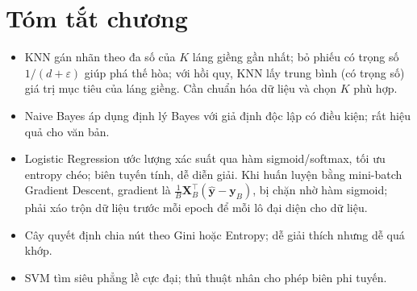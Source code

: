 \section{Tóm tắt chương}
\begin{itemize}
    \item KNN gán nhãn theo đa số của $K$ láng giềng gần nhất; bỏ phiếu có trọng số $1/(d + \varepsilon)$ giúp phá thế hòa; với hồi quy, KNN lấy trung bình (có trọng số) giá trị mục tiêu của láng giềng. Cần chuẩn hóa dữ liệu và chọn $K$ phù hợp.
    \item Naive Bayes áp dụng định lý Bayes với giả định độc lập có điều kiện; rất hiệu quả cho văn bản.
    \item Logistic Regression ước lượng xác suất qua hàm sigmoid/softmax, tối ưu entropy chéo; biên tuyến tính, dễ diễn giải. Khi huấn luyện bằng mini-batch Gradient Descent, gradient là $\frac{1}{B}\mathbf{X}_B^\top(\hat{\mathbf{y}} - \mathbf{y}_B)$, bị chặn nhờ hàm sigmoid; phải xáo trộn dữ liệu trước mỗi epoch để mỗi lô đại diện cho dữ liệu.
    \item Cây quyết định chia nút theo Gini hoặc Entropy; dễ giải thích nhưng dễ quá khớp.
    \item SVM tìm siêu phẳng lề cực đại; thủ thuật nhân cho phép biên phi tuyến.
\end{itemize}


